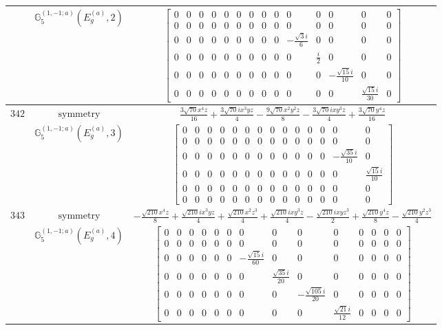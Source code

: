 \documentclass[fleqn,8pt,landscape]{jsarticle}
\begin{document}
\begin{longtable}{ccc}
$  $ & $ \mathbb{G}_{5}^{(1,-1;a)}(E_{g}^{(a)},2) $ & $ \begin{bmatrix} 0 & 0 & 0 & 0 & 0 & 0 & 0 & 0 & 0 & 0 & 0 & 0 & 0 & 0 \\ 0 & 0 & 0 & 0 & 0 & 0 & 0 & 0 & 0 & 0 & 0 & 0 & 0 & 0 \\ 0 & 0 & 0 & 0 & 0 & 0 & 0 & 0 & 0 & - \frac{\sqrt{3} i}{6} & 0 & 0 & 0 & 0 \\ 0 & 0 & 0 & 0 & 0 & 0 & 0 & 0 & 0 & 0 & \frac{i}{2} & 0 & 0 & 0 \\ 0 & 0 & 0 & 0 & 0 & 0 & 0 & 0 & 0 & 0 & 0 & - \frac{\sqrt{15} i}{10} & 0 & 0 \\ 0 & 0 & 0 & 0 & 0 & 0 & 0 & 0 & 0 & 0 & 0 & 0 & \frac{\sqrt{15} i}{30} & 0 \end{bmatrix} $ \\ \hline
$ 342 $ & $ \text{symmetry} $ & $ \frac{3 \sqrt{70} x^{4} z}{16} + \frac{3 \sqrt{70} i x^{3} y z}{4} - \frac{9 \sqrt{70} x^{2} y^{2} z}{8} - \frac{3 \sqrt{70} i x y^{3} z}{4} + \frac{3 \sqrt{70} y^{4} z}{16} $ \\
$  $ & $ \mathbb{G}_{5}^{(1,-1;a)}(E_{g}^{(a)},3) $ & $ \begin{bmatrix} 0 & 0 & 0 & 0 & 0 & 0 & 0 & 0 & 0 & 0 & 0 & 0 & 0 & 0 \\ 0 & 0 & 0 & 0 & 0 & 0 & 0 & 0 & 0 & 0 & 0 & 0 & 0 & 0 \\ 0 & 0 & 0 & 0 & 0 & 0 & 0 & 0 & 0 & 0 & 0 & 0 & - \frac{\sqrt{35} i}{10} & 0 \\ 0 & 0 & 0 & 0 & 0 & 0 & 0 & 0 & 0 & 0 & 0 & 0 & 0 & \frac{\sqrt{15} i}{10} \\ 0 & 0 & 0 & 0 & 0 & 0 & 0 & 0 & 0 & 0 & 0 & 0 & 0 & 0 \\ 0 & 0 & 0 & 0 & 0 & 0 & 0 & 0 & 0 & 0 & 0 & 0 & 0 & 0 \end{bmatrix} $ \\ \hline
$ 343 $ & $ \text{symmetry} $ & $ - \frac{\sqrt{210} x^{4} z}{8} + \frac{\sqrt{210} i x^{3} y z}{4} + \frac{\sqrt{210} x^{2} z^{3}}{4} + \frac{\sqrt{210} i x y^{3} z}{4} - \frac{\sqrt{210} i x y z^{3}}{2} + \frac{\sqrt{210} y^{4} z}{8} - \frac{\sqrt{210} y^{2} z^{3}}{4} $ \\
$  $ & $ \mathbb{G}_{5}^{(1,-1;a)}(E_{g}^{(a)},4) $ & $ \begin{bmatrix} 0 & 0 & 0 & 0 & 0 & 0 & 0 & 0 & 0 & 0 & 0 & 0 & 0 & 0 \\ 0 & 0 & 0 & 0 & 0 & 0 & 0 & 0 & 0 & 0 & 0 & 0 & 0 & 0 \\ 0 & 0 & 0 & 0 & 0 & 0 & - \frac{\sqrt{15} i}{60} & 0 & 0 & 0 & 0 & 0 & 0 & 0 \\ 0 & 0 & 0 & 0 & 0 & 0 & 0 & \frac{\sqrt{35} i}{20} & 0 & 0 & 0 & 0 & 0 & 0 \\ 0 & 0 & 0 & 0 & 0 & 0 & 0 & 0 & - \frac{\sqrt{105} i}{20} & 0 & 0 & 0 & 0 & 0 \\ 0 & 0 & 0 & 0 & 0 & 0 & 0 & 0 & 0 & \frac{\sqrt{21} i}{12} & 0 & 0 & 0 & 0 \end{bmatrix} $ \\ \hline

\end{longtable}
\end{document}
